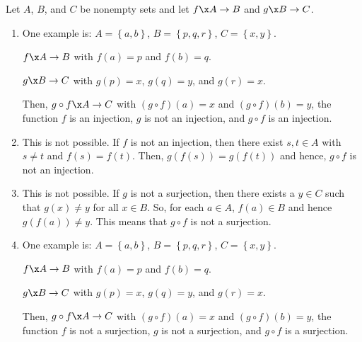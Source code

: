\documentclass[11pt]{article}
\begin{document}
\noindent
Let  $A$, $B$, and  $C$  be nonempty sets and let  $f\x A \to B$  and  $g\x B \to C$.

\begin{enumerate} 
\item One example is:  $A = \left\{ {a, b} \right\}$, $B = \left\{ {p, q, r} \right\}$, 
$C = \left\{ {x, y} \right\}$.

$f\x A \to B$  with  $f\left( a \right) = p$ and  $f\left( b \right) = q$.

$g\x B \to C$ with  $g\left( p \right) = x$, $g\left( q \right) = y$, and  $g\left( r \right) = x$. 

Then,
$g \circ f\x A \to C$  with  $\left( {g \circ f} \right)\left( a \right) = x$  and   
$\left( {g \circ f} \right)\left( b \right) = y$, the function  $f$  is an injection,  $g$  is not an injection, and  $g \circ f$ is an injection.

\item This is not possible.  If  $f$  is not an injection, then there exist  $s, t \in A$ with  
$s \ne t$  and  $f\left( s \right) = f\left( t \right)$.  Then,  
$g\left( {f\left( s \right)} \right) = g\left( {f\left( t \right)} \right)$ and hence, $g \circ f$
is not an injection.

\item This is not possible.  If  $g$  is not a surjection, then there exists a  $y \in C$ such that  $g\left( x \right) \ne y$ for all  $x \in B$.  So, for each  $a \in A$,  
$f\left( a \right) \in B$ and hence  $g\left( {f\left( a \right)} \right) \ne y$.  This means that  $g \circ f$ is not a surjection.

\item One example is:  $A = \left\{ {a, b} \right\}$, $B = \left\{ {p, q, r} \right\}$, 
$C = \left\{ {x, y} \right\}$.

$f\x A \to B$  with  $f\left( a \right) = p$ and  $f\left( b \right) = q$.

$g\x B \to C$ with  $g\left( p \right) = x$, $g\left( q \right) = y$, and  $g\left( r \right) = x$. 

Then, $g \circ f\x A \to C$  with  $\left( {g \circ f} \right)\left( a \right) = x$  and   
$\left( {g \circ f} \right)\left( b \right) = y$, the function  $f$  is not a surjection,  $g$  is not a surjection, and  $g \circ f$ is a surjection.

\end{enumerate}
\end{document}
